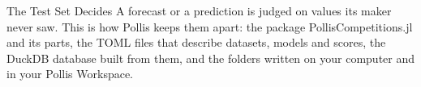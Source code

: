 

\usepackage{titlesec}
\usepackage{tabularx}
\usepackage{booktabs}
\usepackage{listings}

\fancyhf{}
\fancyfoot[R]{\footnotesize\color{soft}\thepage}

\titleformat{\section}{\color{navy}\large\bfseries}{\color{deepamber}\thesection}{0.6em}{}
\titleformat{\subsection}{\color{navy}\normalsize\bfseries}{\color{deepamber}\thesubsection}{0.5em}{}
\titlespacing*{\section}{0pt}{12pt}{4pt}
\titlespacing*{\subsection}{0pt}{8pt}{2pt}
\setlength{\parskip}{4pt}


\usepackage{xurl}
\newcommand{\file}[1]{{\small\nolinkurl{#1}}}
\newcommand{\sig}[1]{{\small\ttfamily\detokenize{#1}}}



  {The Test Set Decides}
  {A forecast or a prediction is judged on values its maker never saw. This is how Pollis keeps them apart: the
   package PollisCompetitions.jl and its parts, the TOML files that describe datasets, models and scores, the DuckDB
   database built from them, and the folders written on your computer and in your Pollis Workspace.}


